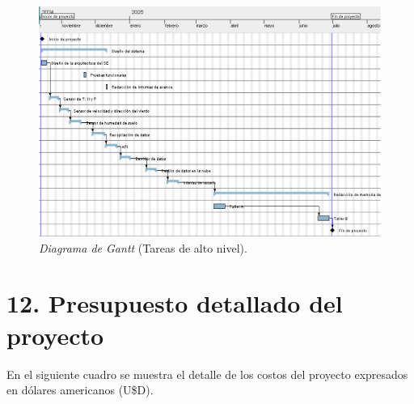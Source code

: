 \documentclass[
11pt, %
]{charter}
\begin{document}
\begin{landscape}
\begin{figure}[htpb]
\centering 
\includegraphics[width=1.55\textwidth, height=1\textheight]{./Figuras/GanttHigh.png}
\caption{\textit{Diagrama de Gantt} (Tareas de alto nivel).} %
\label{fig:diagGanttHighLevel}
\end{figure}
\end{landscape}


\section{12. Presupuesto detallado del proyecto}
\label{sec:presupuesto}

En el siguiente cuadro se muestra el detalle de los costos del proyecto expresados en dólares
americanos (U\$D).
\end{document}
